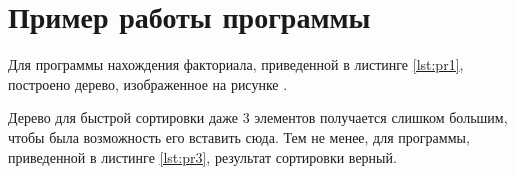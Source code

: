 \section{Пример работы программы}
Для программы нахождения факториала, приведенной в листинге \ref{lst:pr1}, построено дерево, изображенное на рисунке .

\begin{figure}[H]
\end{figure}
 
Дерево для быстрой сортировки даже 3 элементов получается слишком большим, чтобы была возможность его вставить сюда. Тем не менее, для программы, приведенной в листинге \ref{lst:pr3}, результат сортировки верный.


